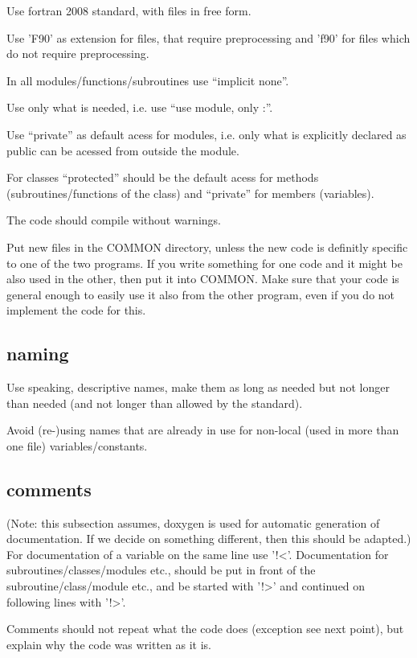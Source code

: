 \documentclass{article}
\begin{document}
Use fortran 2008 standard, with files in free form.

Use 'F90' as extension for files, that require preprocessing and 'f90'
for files which do not require preprocessing.

In all modules/functions/subroutines use ``implicit none''.

Use only what is needed, i.e. use ``use module, only :''.

Use ``private'' as default acess for modules, i.e. only what is
explicitly declared as public can be acessed from outside the module.

For classes ``protected'' should be the default acess for methods
(subroutines/functions of the class) and ``private'' for members
(variables).

The code should compile without warnings.

Put new files in the COMMON directory, unless the new code is definitly
specific to one of the two programs.
If you write something for one code and it might be also used in the
other, then put it into COMMON. Make sure that your code is general
enough to easily use it also from the other program, even if you do not
implement the code for this.

\subsection{naming}
Use speaking, descriptive names, make them as long as needed but not
longer than needed (and not longer than allowed by the standard).

Avoid (re-)using names that are already in use for non-local (used in
more than one file) variables/constants.

\subsection{comments}
(Note: this subsection assumes, doxygen is used for automatic generation
of documentation. If we decide on something different, then this should
be adapted.)\\
For documentation of a variable on the same line use '!<'.
Documentation for subroutines/classes/modules etc., should be put in
front of the subroutine/class/module etc., and be started with '!>' and
continued on following lines with '!>'.

Comments should not repeat what the code does (exception see next
point), but explain why the code was written as it is.
\end{document}
